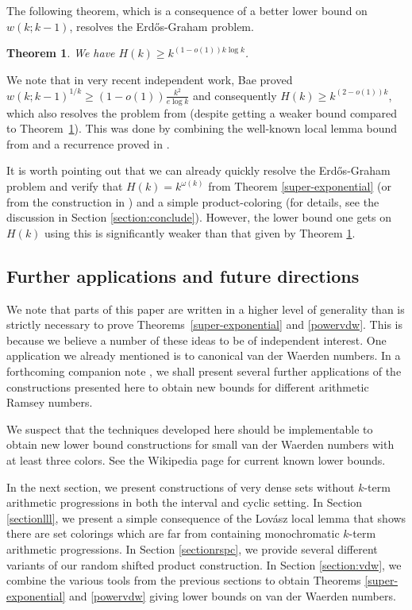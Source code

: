\documentclass[11pt]{article}
\numberwithin{equation}{section}
\newtheorem{thm}{Theorem}
\theoremstyle{definition}
\theoremstyle{remark}
\begin{document}
The following theorem, which is a consequence of a better lower bound on $w(k;k-1)$, resolves the Erd\H{o}s-Graham problem. 

\begin{thm}\label{canonicallower}
We have $H(k) \geq k^{(1-o(1))k\log k}$.     
\end{thm}

\noindent We note that in very recent independent work, Bae \cite{Bae} proved $w(k;k-1)^{1/k}\ge (1-o(1))\frac{k^2}{e\log k}$ and consequently $H(k)\ge k^{(2-o(1))k}$, which also resolves the problem from \cite{erdosgraham} (despite getting a weaker bound compared to Theorem~\ref{canonicallower}). This was done by combining the well-known local lemma bound from \cite{erdos lovasz} and a recurrence proved in \cite{BCT}. 


It is worth pointing out that we can already quickly resolve the Erd\H{o}s-Graham problem and verify that $H(k)=k^{\omega(k)}$ from Theorem \ref{super-exponential} (or from the construction in \cite{Hunter}) and a simple product-coloring (for details, see the discussion in Section \ref{section:conclude}). However, the lower bound one gets on $H(k)$ using this is significantly weaker than that given by Theorem \ref{canonicallower}.




\subsection{Further applications and future directions}

We note that parts of this paper are written in a higher level of generality than is strictly necessary to prove Theorems~\ref{super-exponential} and \ref{powervdw}. This is because we believe a number of these ideas to be of independent interest. One application we already mentioned is to canonical van der Waerden numbers. In a forthcoming companion note \cite{FH}, we shall present several further applications of the constructions presented here to obtain new bounds for different arithmetic Ramsey numbers. 

We suspect that the techniques developed here should be implementable to obtain new lower bound constructions for small van der Waerden numbers with at least three colors. See the Wikipedia page \cite{wikivdw} for current known lower bounds. 


 In the next section, we present constructions of very dense sets without $k$-term arithmetic progressions in both the interval and cyclic setting. In Section \ref{sectionlll}, we present a simple consequence of the Lov\'asz local lemma that shows there are set colorings which are far from containing monochromatic $k$-term arithmetic progressions. In Section \ref{sectionrspc}, we provide several different variants of our random shifted product construction. In Section \ref{section:vdw}, we combine the various tools from the previous sections to obtain Theorems \ref{super-exponential} and \ref{powervdw} giving lower bounds on van der Waerden numbers. 
\end{document}
